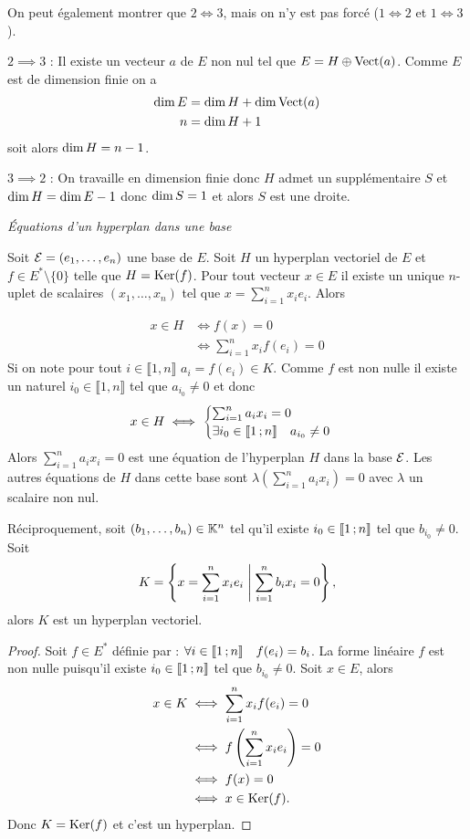 On peut également montrer que \(2 \iff 3\), mais on n'y est pas forcé (\(1 \iff
2\) et \(1 \iff 3\)).

\(2 \implies 3\) : Il existe un vecteur \(a\) de \(E\) non nul tel que \(E=H
\oplus \operatorname{Vect}(a)\). Comme \(E\) est de dimension finie on a
\begin{align}
  \operatorname{dim} E &= \operatorname{dim} H +\operatorname{dim} \operatorname{Vect}(a)\\
  n &= \operatorname{dim} H +1
\end{align}
soit alors \(\operatorname{dim} H = n-1\).

\(3 \implies 2\) : On travaille en dimension finie donc \(H\) admet un
supplémentaire \(S\) et \(\operatorname{dim} H = \operatorname{dim} E -1\) donc \(\operatorname{dim} S=1\) et alors \(S\)
est une droite.

\emph{Équations d'un hyperplan dans une base}

Soit \(\mathcal{E}=(e_1, \ldots, e_n)\) une base de \(E\). Soit \(H\) un hyperplan
vectoriel de \(E\) et \(f \in E^*\setminus\{0\}\) telle que \(H=\operatorname{Ker}(f)\). Pour
tout vecteur \(x \in E\) il existe un unique \(n\)-uplet de scalaires
\((x_1,\ldots, x_n)\) tel que \(x = \sum_{i=1}^n x_i e_i\). Alors

\begin{align}
  x \in H &\iff f(x)=0\\
  &\iff \sum_{i=1}^n x_i f(e_i)=0
\end{align}
Si on note pour tout \(i \in \llbracket 1,n \rrbracket\) \(a_i=f(e_i) \in K\).
Comme \(f\) est non nulle il existe un naturel \(i_0 \in \llbracket 1,n
\rrbracket\) tel que \(a_{i_0} \neq 0\) et donc
\begin{equation}
  x \in H \iff
  \begin{cases}
    \sum_{i=1}^n a_i x_i=0 \\ \exists i_0 \in \mathopen{\llbracket}1\mathclose{}\mathpunct{};n\mathclose{\rrbracket} \quad
    a_{i_0} \neq 0
  \end{cases}
\end{equation}
Alors \(\sum_{i=1}^n a_i x_i=0\) est une équation de l'hyperplan \(H\) dans la
base \(\mathcal{E}\). Les autres équations de \(H\) dans cette base sont \(\lambda
\left(\sum_{i=1}^n a_i x_i\right)=0\) avec \(\lambda\) un scalaire non nul.

Réciproquement, soit \((b_1, \ldots, b_n) \in \mathbb{K}^n\) tel qu'il existe \(i_0 \in
\mathopen{\llbracket}1\mathclose{}\mathpunct{};n\mathclose{\rrbracket}\) tel que \(b_{i_0} \neq 0\). Soit
\begin{equation}
  K = \left\{x = \sum_{i=1}^n x_i e_i\mathrel{}\middle|\mathrel{}\sum_{i=1}^n b_i x_i =0\right\},
\end{equation}
alors \(K\) est un hyperplan vectoriel.
\begin{proof}
  Soit \(f \in E^*\) définie par : \(\forall i \in \mathopen{\llbracket}1\mathclose{}\mathpunct{};n\mathclose{\rrbracket} \quad
  f(e_i)=b_i\). La forme linéaire \(f\) est non nulle puisqu'il existe \(i_0 \in
  \mathopen{\llbracket}1\mathclose{}\mathpunct{};n\mathclose{\rrbracket}\) tel que \(b_{i_0} \neq 0\). Soit \(x \in E\), alors
  \begin{align}
    x \in K &\iff \sum_{i=1}^n x_i f(e_i)=0 \\
    &\iff f\left(\sum_{i=1}^n x_i e_i \right) =0\\
    &\iff f(x)=0\\
    &\iff x \in \operatorname{Ker}(f).
  \end{align}
  Donc \(K=\operatorname{Ker}(f)\) et c'est un hyperplan.
\end{proof}

